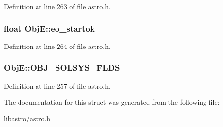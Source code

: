 Definition at line 263 of file astro.\-h.

\hypertarget{struct_obj_e_a645f746b4ddffb8d9d4413bde196a12a}{
\subsubsection[{eo\-\_\-startok}]{\setlength{\rightskip}{0pt plus 5cm}float Obj\-E\-::eo\-\_\-startok}}\label{struct_obj_e_a645f746b4ddffb8d9d4413bde196a12a}


Definition at line 264 of file astro.\-h.

\hypertarget{struct_obj_e_a99f83e9c2a725f3ac18aa4fa6a78b4c6}{
\subsubsection[{O\-B\-J\-\_\-\-S\-O\-L\-S\-Y\-S\-\_\-\-F\-L\-D\-S}]{\setlength{\rightskip}{0pt plus 5cm}Obj\-E\-::\-O\-B\-J\-\_\-\-S\-O\-L\-S\-Y\-S\-\_\-\-F\-L\-D\-S}}\label{struct_obj_e_a99f83e9c2a725f3ac18aa4fa6a78b4c6}


Definition at line 257 of file astro.\-h.



The documentation for this struct was generated from the following file\-:\begin{DoxyCompactItemize}
\item 
libastro/\hyperlink{astro_8h}{astro.\-h}\end{DoxyCompactItemize}
